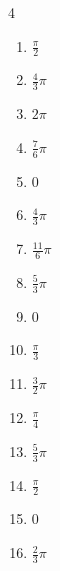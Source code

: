 \begin{multicols}{4}
\begin{enumerate}
  \item $\displaystyle \frac{\pi}{2}$

  \item $\displaystyle \frac{4}{3}\pi$

  \item $\displaystyle 2\pi$

  \item $\displaystyle \frac{7}{6}\pi$

  \item $\displaystyle 0$

  \item $\displaystyle \frac{4}{3}\pi$

  \item $\displaystyle \frac{11}{6}\pi$

  \item $\displaystyle \frac{5}{3}\pi$

  \item $\displaystyle 0$

\columnbreak %

\resetques

  \item $\displaystyle \frac{\pi}{3}$

  \item $\displaystyle \frac{3}{2}\pi$

  \item $\displaystyle \frac{\pi}{4}$

  \item $\displaystyle \frac{5}{3}\pi$

  \item $\displaystyle \frac{\pi}{2}$

  \item $\displaystyle 0$

  \item $\displaystyle \frac{2}{3}\pi$


\end{enumerate}
\end{multicols}
